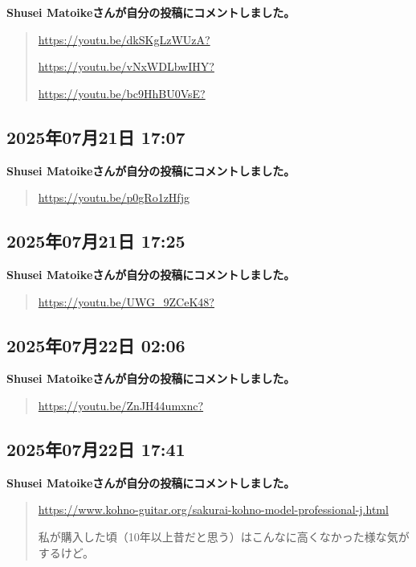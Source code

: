 \textbf{Shusei Matoikeさんが自分の投稿にコメントしました。}

\begin{quote}
\url{https://youtu.be/dkSKgLzWUzA?}

\url{https://youtu.be/vNxWDLbwIHY?}

\url{https://youtu.be/bc9HhBU0VsE?}
\end{quote}

\subsection*{2025年07月21日 17:07}

\textbf{Shusei Matoikeさんが自分の投稿にコメントしました。}

\begin{quote}
\url{https://youtu.be/p0gRo1zHfjg}
\end{quote}

\subsection*{2025年07月21日 17:25}

\textbf{Shusei Matoikeさんが自分の投稿にコメントしました。}

\begin{quote}
\url{https://youtu.be/UWG_9ZCeK48?}
\end{quote}

\subsection*{2025年07月22日 02:06}

\textbf{Shusei Matoikeさんが自分の投稿にコメントしました。}

\begin{quote}
\url{https://youtu.be/ZnJH44umxnc?}
\end{quote}

\subsection*{2025年07月22日 17:41}

\textbf{Shusei Matoikeさんが自分の投稿にコメントしました。}

\begin{quote}
\url{https://www.kohno-guitar.org/sakurai-kohno-model-professional-j.html}

私が購入した頃（10年以上昔だと思う）はこんなに高くなかった様な気がするけど。
\end{quote}

